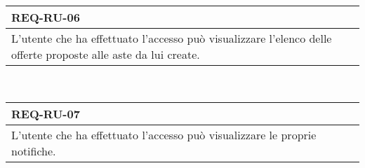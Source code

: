                 \begin{tabular}{|p{}|}
                    \hline
                    \multicolumn{1}{|l|}{\cellcolor{head}\textbf{REQ-RU-06}} \\
                    \hline
                    L'utente che ha effettuato l'accesso può visualizzare l'elenco delle offerte proposte alle aste da lui create. \\
                    \hline
                \end{tabular} \smallskip \\
                \begin{tabular}{|p{}|}
                    \hline
                    \multicolumn{1}{|l|}{\cellcolor{head}\textbf{REQ-RU-07}} \\
                    \hline
                    L'utente che ha effettuato l'accesso può visualizzare le proprie notifiche. \\
                    \hline
                \end{tabular} \smallskip \\
            
